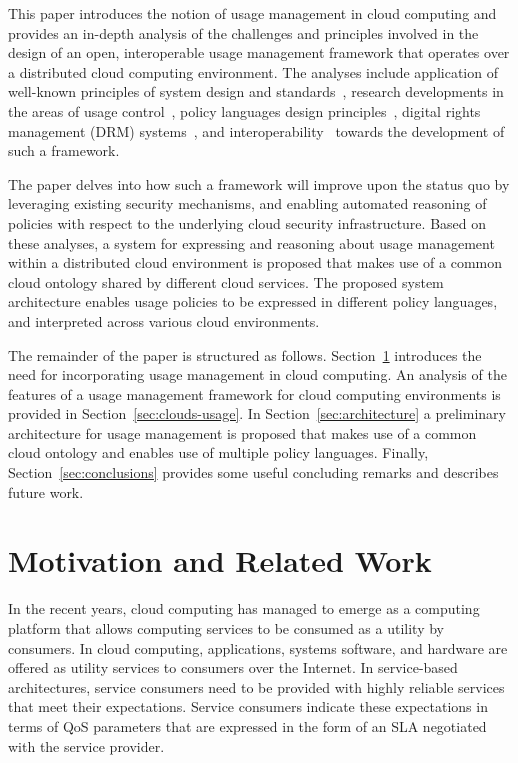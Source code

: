 \documentclass[10pt,letterpaper]{book}
\begin{document}
This paper introduces the notion of usage management in cloud computing and provides an in-depth analysis of the challenges and principles involved in the design of an open, interoperable usage management framework that operates over a distributed cloud computing environment. The analyses include application of well-known principles of system design and standards~\cite{BlCl:01,Cl:88,ClWrSoBr:02}, research developments in the areas of usage control~\cite{PaSa:04,JaHeLa:10}, policy languages design principles~\cite{JaHeMa:06}, digital rights management (DRM) systems~\cite{JaHe:09},  and interoperability~\cite{JaHe:04,HeJa:05,KoLaMaMi:04} towards the development of such a framework.

The paper delves into how such a framework will improve upon the status quo by leveraging  existing security mechanisms, and enabling automated reasoning of policies with respect to the underlying cloud security infrastructure. Based on these analyses, a system for expressing and reasoning about usage management within a distributed cloud environment is proposed that makes use of a common cloud ontology shared by different cloud services. The proposed system architecture enables usage policies to be expressed in different policy languages, and interpreted across various cloud environments. 

The remainder of the paper is structured as follows. Section~\ref{sec:motivation} introduces the need for incorporating usage management in cloud computing. An analysis of the features of a usage management framework for cloud computing environments is provided in Section~\ref{sec:clouds-usage}. In Section~\ref{sec:architecture} a preliminary architecture for usage management is proposed that makes use of a common cloud ontology and enables use of multiple policy languages. Finally, Section~\ref{sec:conclusions} provides some useful concluding remarks and describes future work. 

\section{Motivation and Related Work}\label{sec:motivation}
In the recent years, cloud computing has  managed to emerge as a computing platform that allows computing services to be consumed as a utility by consumers. In cloud computing, applications, systems software, and hardware are offered as utility services to consumers over the Internet. In service-based architectures, service consumers need to be provided with  highly reliable services that meet their expectations. Service consumers indicate these expectations in terms of QoS parameters that are expressed in the form of an SLA negotiated with the service provider. 
\end{document}
